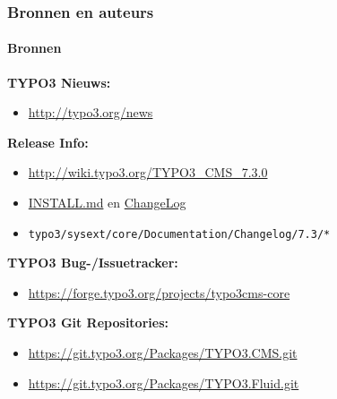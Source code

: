 \begin{frame}[fragile]
	\frametitle{Bronnen en auteurs}
	\framesubtitle{Bronnen}

	\textbf{TYPO3 Nieuws:}
		\begin{itemize}\smaller
			\item \url{http://typo3.org/news}
		\end{itemize}

	\textbf{Release Info:}
		\begin{itemize}\smaller
			\item \url{http://wiki.typo3.org/TYPO3_CMS_7.3.0}
			\item \href{https://github.com/TYPO3/TYPO3.CMS/blob/master/INSTALL.md}{INSTALL.md} en \href{https://github.com/TYPO3/TYPO3.CMS/blob/master/ChangeLog}{ChangeLog}
			\item \texttt{typo3/sysext/core/Documentation/Changelog/7.3/*}
		\end{itemize}

	\textbf{TYPO3 Bug-/Issuetracker:}
		\begin{itemize}\smaller
			\item \url{https://forge.typo3.org/projects/typo3cms-core}
		\end{itemize}

	\textbf{TYPO3 Git Repositories:}
		\begin{itemize}\smaller
			\item \url{https://git.typo3.org/Packages/TYPO3.CMS.git}
			\item \url{https://git.typo3.org/Packages/TYPO3.Fluid.git}
		\end{itemize}

\end{frame}


